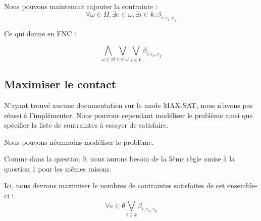 \documentclass[a4paper]{article}
\begin{document}
Nous pouvons maintenant rajouter la contrainte : $$
\forall \omega \in \Omega, \exists e \in \omega, \exists i \in k : \beta_{i, e_x, e_y}
$$

Ce qui donne en FNC :

$$
\bigwedge_{\omega \in \Omega} \bigvee_{e \in \omega} \bigvee_{i \in k} \beta_{i, e_x, e_y}
$$



\subsection{Maximiser le contact}

N'ayant trouvé aucune documentation sur le mode MAX-SAT, nous n'avons pas réussi à l'implémenter.
Nous pouvons cependant modéliser le problème ainsi que spécifier la liste de contraintes à essayer de satisfaire.

Nous pouvons néenmoins modéliser le problème.

Comme dans la question 9, nous aurons besoin de la 5ème règle omise à la question 1 pour les mêmes raisons.

Ici, nous devrons maximiser le nombres de contraintes satisfaites de cet ensemble-ci :
$$
  \forall e \in \theta \bigvee_{i \in k} \beta_{i, e_x, e_y}
$$
\end{document}
